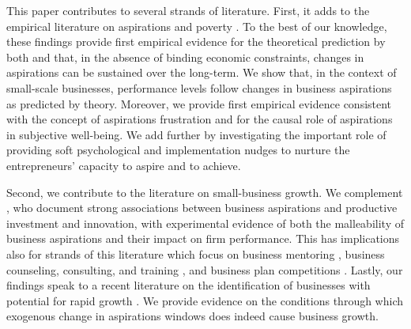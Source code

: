 \documentclass[11.5pt]{article}
\begin{document}
This paper contributes to several strands of literature. First, it adds to the empirical literature on aspirations and poverty \citep[e.g.,][]{Bernard2014, Riley2017, Beaman2012, Janzen2017}. To the best of our knowledge, these findings provide first empirical evidence for the theoretical prediction by both \citet{Genicot2017} and \citet{Dalton2016} that, in the absence of binding economic constraints, changes in aspirations can be sustained over the long-term. We show that, in the context of small-scale businesses, performance levels follow changes in business aspirations as predicted by theory. Moreover, we provide first empirical evidence consistent with the concept of aspirations frustration \citep{Ray2006, Genicot2017} and for the causal role of aspirations in subjective well-being. %
We add further by investigating the important role of providing soft psychological and implementation nudges to nurture the entrepreneurs' capacity to aspire and to achieve. 

Second, we contribute to the literature on small-business growth. We complement \citet{Dalton2018}, who document strong associations between business aspirations and productive investment and innovation, with experimental evidence of both the malleability of business aspirations and their impact on firm performance.%
 This has implications also for strands of this literature which focus on business mentoring \citep[e.g.,][]{Brooks2018, Cai2017}, business counseling, consulting, and training \citep[for reviews see,][]{Carpena2017, McKenzie2014}, and business plan competitions \citep[e.g.,][]{McKenzie2017a, Bjorvatn2015}. Lastly, our findings speak to a recent literature on the identification of businesses with potential for rapid growth \citep[see,][]{Fafchamps2016, Fafchamps2017}. We provide evidence on the conditions through which exogenous change in aspirations windows does indeed cause business growth. %
\end{document}
